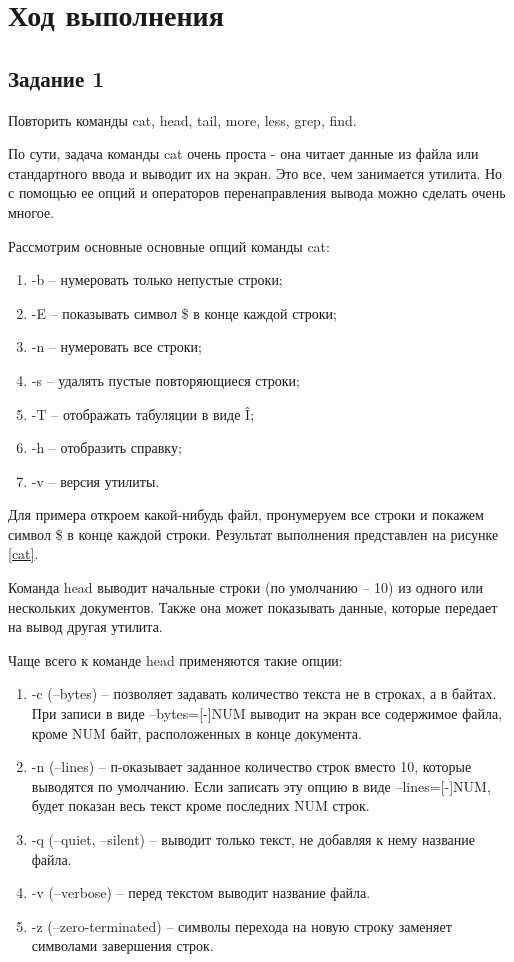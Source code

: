 \section{Ход выполнения}
\subsection{Задание 1}

Повторить команды cat, head, tail, more, less, grep, find.

По сути, задача команды cat очень проста - она читает данные из файла или стандартного ввода и выводит их на экран. Это все, чем занимается утилита. Но с помощью ее опций и операторов перенаправления вывода можно сделать очень многое.

Рассмотрим основные основные опций команды cat:
\begin{enumerate}
    \item -b -- нумеровать только непустые строки;
    \item -E -- показывать символ \$ в конце каждой строки;
    \item -n -- нумеровать все строки;
    \item -s -- удалять пустые повторяющиеся строки;
    \item -T -- отображать табуляции в виде  \^  I;
    \item -h -- отобразить справку;
    \item -v -- версия утилиты.
\end{enumerate}

Для примера откроем какой-нибудь файл, пронумеруем все строки и покажем символ \$ в конце каждой строки. Результат выполнения представлен на рисунке \ref{cat}.


Команда head выводит начальные строки (по умолчанию -- 10)  из одного или нескольких документов. Также она может показывать данные, которые передает на вывод другая утилита.

Чаще всего к команде head применяются такие опции:
\begin{enumerate}
    \item -c (--bytes) -- позволяет задавать количество текста не в строках, а в байтах. При записи в виде --bytes=[-]NUM выводит на экран все содержимое файла, кроме NUM байт, расположенных в конце документа.
    \item -n (--lines) -- п-оказывает заданное количество строк вместо 10, которые выводятся по умолчанию. Если записать эту опцию в виде --lines=[-]NUM, будет показан весь текст кроме последних NUM строк.
    \item -q (--quiet, --silent) -- выводит только текст, не добавляя к нему название файла.
    \item -v (--verbose) -- перед текстом выводит название файла.
    \item -z (--zero-terminated) -- символы перехода на новую строку заменяет символами завершения строк.
\end{enumerate}

